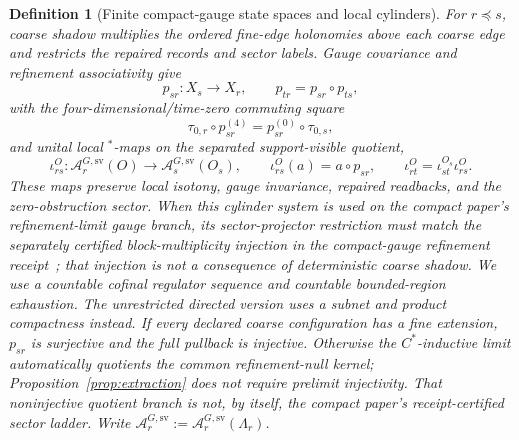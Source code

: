 \documentclass[11pt]{article}
\numberwithin{equation}{section}
\newtheorem{definition}[theorem]{Definition}
\theoremstyle{remark}
\begin{document}
\begin{definition}[Finite compact-gauge state spaces and local cylinders]
For \(r\preceq s\), coarse shadow multiplies the ordered fine-edge holonomies above each coarse
edge and restricts the repaired records and sector labels. Gauge covariance and refinement
associativity give
\[
p_{sr}:X_s\to X_r,
\qquad
p_{tr}=p_{sr}\circ p_{ts},
\]
with the four-dimensional/time-zero commuting square
\[
\tau_{0,r}\circ p_{sr}^{(4)}
=p_{sr}^{(0)}\circ\tau_{0,s},
\]
and unital local \(^*\)-maps on the separated support-visible quotient,
\[
\iota_{rs}^{O}:\mathcal A_r^{G,\mathrm{sv}}(O)\to
\mathcal A_s^{G,\mathrm{sv}}(O_s),
\qquad
\iota_{rs}^{O}(a)=a\circ p_{sr},
\qquad
\iota_{rt}^{O}=\iota_{st}^{O_s}\iota_{rs}^{O}.
\]
These maps preserve local isotony, gauge invariance, repaired readbacks, and the
zero-obstruction sector. When this cylinder system is used on the compact paper's refinement-limit
gauge branch, its sector-projector restriction must match the separately certified
block-multiplicity injection in the compact-gauge refinement receipt~\cite{oph2}; that injection is
not a consequence of deterministic coarse shadow. We use a countable cofinal regulator
sequence and countable bounded-region exhaustion. The unrestricted directed version uses a subnet
and product compactness instead. If every declared coarse configuration has a fine extension,
\(p_{sr}\) is surjective and the full pullback is injective. Otherwise the \(C^*\)-inductive limit
automatically quotients the common refinement-null kernel; Proposition~\ref{prop:extraction} does
not require prelimit injectivity. That noninjective quotient branch is not, by itself, the compact
paper's receipt-certified sector ladder. Write
\(\mathcal A_r^{G,\mathrm{sv}}:=\mathcal A_r^{G,\mathrm{sv}}(\Lambda_r)\).
\end{definition}
\end{document}
